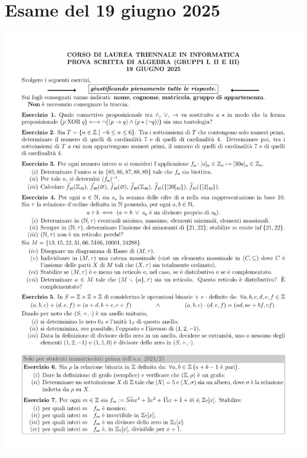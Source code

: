 \section{Esame del 19 giugno 2025}
\begin{center}
    \includegraphics[scale=.85]{pdf/25-06-19.pdf}
\end{center}

